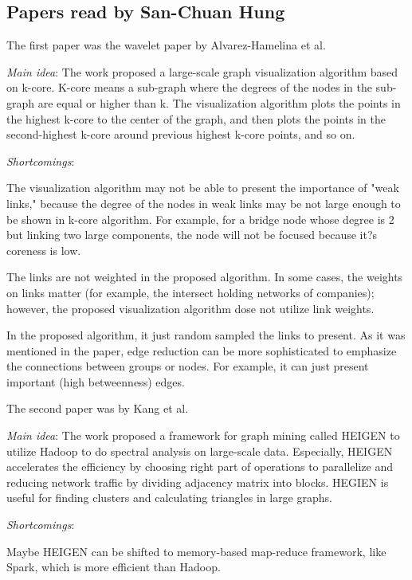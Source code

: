 \subsection{Papers read by San-Chuan Hung }
The first paper was the wavelet paper by Alvarez-Hamelina et al.
\cite{Daubechies92Ten}
\begin{itemize*}
\item {\em Main idea}: The work proposed a large-scale graph visualization algorithm based on k-core. K-core means a sub-graph where the degrees of the nodes in the sub-graph are equal or higher than k. The visualization algorithm plots the points in the highest k-core to the center of the graph, and then plots the points in the second-highest k-core around previous highest k-core points, and so on.
\item {\em Shortcomings}:
		\begin{itemize*}
		\item
			The visualization algorithm may not be able to present the importance of "weak links," because the degree of the nodes in weak links may be not large enough to be shown in k-core algorithm. For example, for a bridge node whose degree is 2 but linking two large components, the node will not be focused because it?s coreness is low.
		\item
			The links are not weighted in the proposed algorithm. In some cases, the weights on links matter (for example, the intersect holding networks of companies); however, the proposed visualization algorithm dose not utilize link weights.
		\item
			In the proposed algorithm, it just random sampled the links to present.  As it was mentioned in the paper, edge reduction can be more sophisticated to emphasize the connections between groups or nodes. For example, it can just present important (high betweenness) edges.
		\end{itemize*}
\end{itemize*}

The second paper was by Kang et al.
\cite{Daubechies92Ten}
\begin{itemize*}
\item {\em Main idea}: The work proposed a framework for graph mining called HEIGEN to utilize Hadoop to do spectral analysis on large-scale data. Especially, HEIGEN accelerates the efficiency by choosing right part of operations to parallelize and reducing network traffic by dividing adjacency matrix into blocks. HEGIEN is useful for finding clusters and calculating triangles in large graphs.
\item {\em Shortcomings}:
		\begin{itemize*}
		\item
			Maybe HEIGEN can be shifted to memory-based map-reduce framework, like Spark, which is more efficient than Hadoop.
		\end{itemize*}
\end{itemize*}

